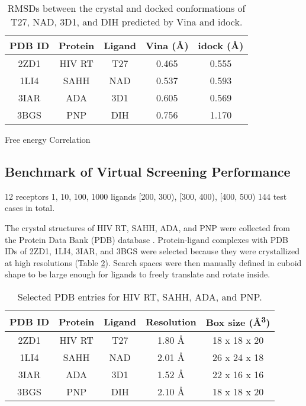 \documentclass[10pt,conference,compsocconf]{../IEEEtran}
\begin{document}
\begin{table}
\centering
\begin{tabular*}
{\linewidth}
{@{\extracolsep{\fill}}ccccc}
\toprule
PDB ID & Protein & Ligand & Vina (\AA) & idock (\AA)\\
\midrule
2ZD1 & HIV RT & T27 & 0.465 & 0.555\\
1LI4 & SAHH   & NAD & 0.537 & 0.593\\
3IAR & ADA    & 3D1 & 0.605 & 0.569\\
3BGS & PNP    & DIH & 0.756 & 1.170\\
\bottomrule
\end{tabular*}
\caption{RMSDs between the crystal and docked conformations of T27, NAD, 3D1, and DIH predicted by Vina and idock.}
\label{tab:RMSD}
\end{table}

Free energy Correlation

\subsection{Benchmark of Virtual Screening Performance}

12 receptors
1, 10, 100, 1000 ligands
[200, 300), [300, 400), [400, 500)
144 test cases in total.

The crystal structures of HIV RT, SAHH, ADA, and PNP were collected from the Protein Data Bank (PDB) database \cite{539,537}. Protein-ligand complexes with PDB IDs of 2ZD1, 1LI4, 3IAR, and 3BGS were selected because they were crystallized at high resolutions (Table \ref{tab:SelectedPDBEntries}). Search spaces were then manually defined in cuboid shape to be large enough for ligands to freely translate and rotate inside.

\begin{table}
\centering
\begin{tabular*}
{\linewidth}
{@{\extracolsep{\fill}}ccccc}
\toprule
PDB ID & Protein & Ligand & Resolution & Box size (\AA\textsuperscript{3})\\
\midrule
2ZD1 & HIV RT & T27 & 1.80 \AA & 18 x 18 x 20\\
1LI4 & SAHH   & NAD & 2.01 \AA & 26 x 24 x 18\\
3IAR & ADA    & 3D1 & 1.52 \AA & 22 x 16 x 16\\
3BGS & PNP    & DIH & 2.10 \AA & 18 x 18 x 20\\
\bottomrule
\end{tabular*}
\caption{Selected PDB entries for HIV RT, SAHH, ADA, and PNP.}
\label{tab:SelectedPDBEntries}
\end{table}
\end{document}
